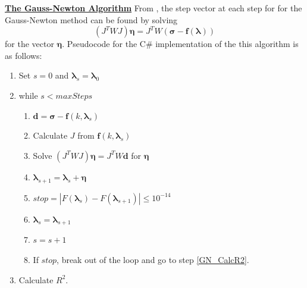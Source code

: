 \documentclass[12pt, a4paper, notitlepage]{article}
\numberwithin{equation}{subsection}
\numberwithin{figure}{subsection}
\numberwithin{table}{subsection}
\newcommand{\lambdaVect}{\pmb{\lambda}}
\begin{document}
\textbf{\underline{The Gauss-Newton Algorithm}}
\newline
From \cite{Gavin}, the step vector at each step for for the Gauss-Newton method can be found by solving 
\begin{equation}
    (J^T W J) \pmb{\eta} = J^T W (\pmb{\sigma} - \pmb{f}(\lambdaVect))
\end{equation}
for the vector $\pmb{\eta}$.  Pseudocode for the C\# implementation of the this algorithm is as follows:
\begin{enumerate}
	\item Set $s = 0$ and $\lambdaVect_s = \lambdaVect_0$
    \item while $s < maxSteps$
      \begin{enumerate}
          \item $\pmb{d} = \pmb{\sigma} - \pmb{f}(k,\lambdaVect_{s})$
          \item Calculate $J$ from $\pmb{f}(k,\lambdaVect_{s})$
          \item Solve $(J^T W J) \pmb{\eta} = J^T W \pmb{d}$ for $\pmb{\eta}$
          \item $\lambdaVect_{s+1} = \lambdaVect_{s} + \pmb{\eta}$
          \item $stop = |F(\lambdaVect_{s}) - F(\lambdaVect_{s+1})| \leq 10^{-14}$
          \item $\lambdaVect_{s} = \lambdaVect_{s+1}$
          \item $s = s + 1$
          \item If $stop$, break out of the loop and go to step \ref{GN_CalcR2}.
      \end{enumerate}
    \item Calculate $R^2$.\label{GN_CalcR2}
\end{enumerate}
\end{document}
